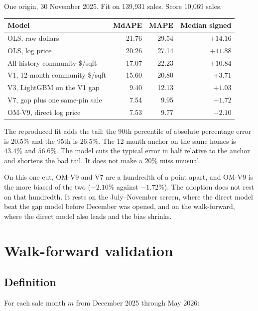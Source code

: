 \documentclass[11pt]{article}
\newcommand{\modelid}{OM-V9}
\begin{document}
One origin, 30 November 2025. Fit on 139{,}931 sales. Score 10{,}069 sales.

\begin{center}
\begin{tabular}{lrrr}
\toprule
Model & MdAPE & MAPE & Median signed \\
\midrule
OLS, raw dollars & 21.76 & 29.54 & \(+14.16\) \\
OLS, log price & 20.26 & 27.14 & \(+11.88\) \\
All-history community \$/sqft & 17.07 & 22.23 & \(+10.84\) \\
V1, 12-month community \$/sqft & 15.60 & 20.80 & \(+3.71\) \\
V3, LightGBM on the V1 gap & 9.40 & 12.13 & \(+1.03\) \\
V7, gap plus one same-pin sale & 7.54 & 9.95 & \(-1.72\) \\
\modelid{}, direct log price & 7.53 & 9.77 & \(-2.10\) \\
\bottomrule
\end{tabular}
\end{center}

The reproduced fit adds the tail: the 90th percentile of absolute percentage error is \(20.5\%\) and the 95th is \(26.5\%\). The 12-month anchor on the same homes is \(43.4\%\) and \(56.6\%\). The model cuts the typical error in half relative to the anchor and shortens the bad tail. It does not make a \(20\%\) miss unusual.

On this one cut, \modelid{} and V7 are a hundredth of a point apart, and \modelid{} is the more biased of the two (\(-2.10\%\) against \(-1.72\%\)). The adoption does not rest on that hundredth. It rests on the July--November screen, where the direct model beat the gap model before December was opened, and on the walk-forward, where the direct model also leads and the bias shrinks.

\section{Walk-forward validation}
\label{sec:walk}

\subsection{Definition}

For each sale month \(m\) from December 2025 through May 2026:
\end{document}
